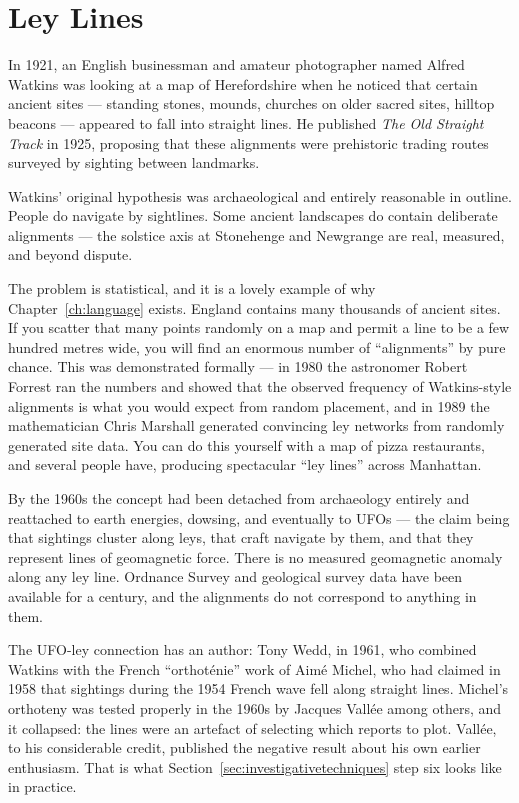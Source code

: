 \section{Ley Lines}\label{sec:leylines}

In 1921, an English businessman and amateur photographer named Alfred Watkins was looking at
a map of Herefordshire when he noticed that certain ancient sites --- standing stones,
mounds, churches on older sacred sites, hilltop beacons --- appeared to fall into straight
lines. He published \emph{The Old Straight Track} in 1925, proposing that these alignments
were prehistoric trading routes surveyed by sighting between landmarks.

Watkins' original hypothesis was archaeological and entirely reasonable in outline. People do
navigate by sightlines. Some ancient landscapes do contain deliberate alignments --- the
solstice axis at Stonehenge and Newgrange are real, measured, and beyond dispute.

The problem is statistical, and it is a lovely example of why Chapter~\ref{ch:language} exists. England
contains many thousands of ancient sites. If you scatter that many points randomly on a map
and permit a line to be a few hundred metres wide, you will find an enormous number of
``alignments'' by pure chance. This was demonstrated formally --- in 1980 the astronomer
Robert Forrest ran the numbers and showed that the observed frequency of Watkins-style
alignments is what you would expect from random placement, and in 1989 the mathematician
Chris Marshall generated convincing ley networks from randomly generated site data. You can
do this yourself with a map of pizza restaurants, and several people have, producing
spectacular ``ley lines'' across Manhattan.

By the 1960s the concept had been detached from archaeology entirely and reattached to earth
energies, dowsing, and eventually to UFOs --- the claim being that sightings cluster along
leys, that craft navigate by them, and that they represent lines of geomagnetic force. There
is no measured geomagnetic anomaly along any ley line. Ordnance Survey and geological survey
data have been available for a century, and the alignments do not correspond to anything in
them.

\begin{funfact}
The UFO-ley connection has an author: Tony Wedd, in 1961, who combined Watkins with the
French ``orthot\'enie'' work of Aim\'e Michel, who had claimed in 1958 that sightings during
the 1954 French wave fell along straight lines. Michel's orthoteny was tested properly in
the 1960s by Jacques Vall\'ee among others, and it collapsed: the lines were an artefact of
selecting which reports to plot. Vall\'ee, to his considerable credit, published the negative
result about his own earlier enthusiasm. That is what Section~\ref{sec:investigativetechniques} step six looks like in
practice.
\end{funfact}

